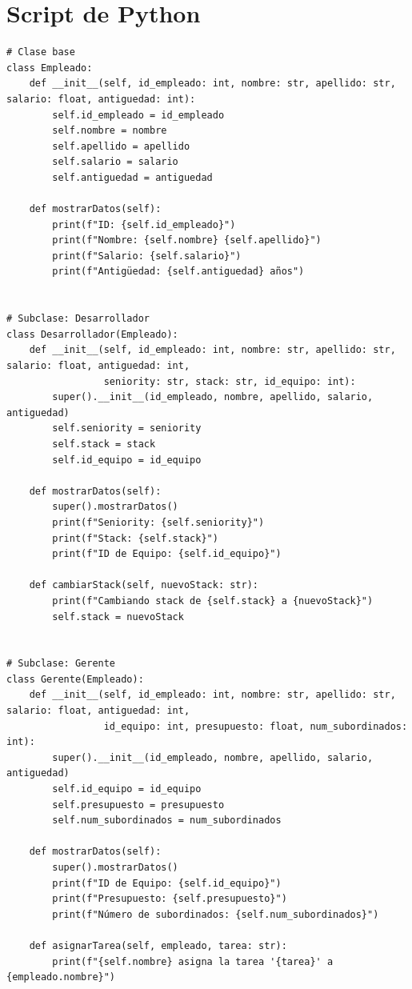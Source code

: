 \documentclass{article}
\begin{document}
\section*{Script de Python}
\begin{lstlisting}[caption={Código python basado en el diagrama UML}, label={lst:python}]
# Clase base
class Empleado:
    def __init__(self, id_empleado: int, nombre: str, apellido: str, salario: float, antiguedad: int):
        self.id_empleado = id_empleado
        self.nombre = nombre
        self.apellido = apellido
        self.salario = salario
        self.antiguedad = antiguedad

    def mostrarDatos(self):
        print(f"ID: {self.id_empleado}")
        print(f"Nombre: {self.nombre} {self.apellido}")
        print(f"Salario: {self.salario}")
        print(f"Antigüedad: {self.antiguedad} años")


# Subclase: Desarrollador
class Desarrollador(Empleado):
    def __init__(self, id_empleado: int, nombre: str, apellido: str, salario: float, antiguedad: int,
                 seniority: str, stack: str, id_equipo: int):
        super().__init__(id_empleado, nombre, apellido, salario, antiguedad)
        self.seniority = seniority
        self.stack = stack
        self.id_equipo = id_equipo

    def mostrarDatos(self):
        super().mostrarDatos()
        print(f"Seniority: {self.seniority}")
        print(f"Stack: {self.stack}")
        print(f"ID de Equipo: {self.id_equipo}")

    def cambiarStack(self, nuevoStack: str):
        print(f"Cambiando stack de {self.stack} a {nuevoStack}")
        self.stack = nuevoStack


# Subclase: Gerente
class Gerente(Empleado):
    def __init__(self, id_empleado: int, nombre: str, apellido: str, salario: float, antiguedad: int,
                 id_equipo: int, presupuesto: float, num_subordinados: int):
        super().__init__(id_empleado, nombre, apellido, salario, antiguedad)
        self.id_equipo = id_equipo
        self.presupuesto = presupuesto
        self.num_subordinados = num_subordinados

    def mostrarDatos(self):
        super().mostrarDatos()
        print(f"ID de Equipo: {self.id_equipo}")
        print(f"Presupuesto: {self.presupuesto}")
        print(f"Número de subordinados: {self.num_subordinados}")

    def asignarTarea(self, empleado, tarea: str):
        print(f"{self.nombre} asigna la tarea '{tarea}' a {empleado.nombre}")


\end{lstlisting}
\end{document}
